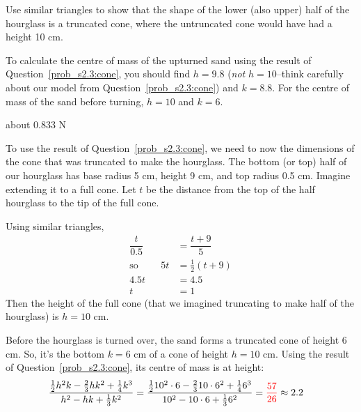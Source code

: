 \begin{hint}
Use similar triangles to show that the shape of the lower (also upper) half of the hourglass is a truncated cone, where the untruncated cone would have had a height 10 cm.

To calculate the centre of mass of the upturned sand using the result of Question~\ref{prob_s2.3:cone}, you should find $h=9.8$ (\emph{not} $h=10$--think carefully about our model from Question~\ref{prob_s2.3:cone}) and $k=8.8$. For the centre of mass of the sand before turning, $h=10$ and $k=6$.
\end{hint}
\begin{answer}
about 0.833 N
\end{answer}
\begin{solution}
To use the result of Question~\ref{prob_s2.3:cone}, we need to now the dimensions of the cone that was truncated to make the hourglass. The bottom (or top) half of our hourglass has base radius 5 cm,  height 9 cm, and top radius 0.5 cm. Imagine extending it to a full cone. Let $t$ be the distance from the top of the half hourglass to the tip of the full cone.
\begin{center}
\end{center}
Using similar triangles, \begin{align*}\dfrac{t}{0.5} &= \dfrac{t+9}{5}\\
\text{so }\qquad 5t&=\frac{1}{2}(t+9)\\
4.5t&=4.5\\
t&=1
\end{align*}
Then the height of the full cone (that we imagined truncating to make half of the hourglass) is $h=10$ cm.

Before the hourglass is turned over, the sand forms a truncated cone of height $6$ cm. So, it's the bottom $k=6$ cm of a cone of height $h=10$ cm. Using the result of Question~\ref{prob_s2.3:cone}, its centre of mass is at height:
\begin{align*}
\frac{\frac{1}{2}h^2k - \frac{2}{3}hk^2+\frac{1}{4}k^3}{h^2-hk+\frac{1}{3}k^2}&=
\frac{\frac{1}{2}10^2\cdot 6 - \frac{2}{3}10\cdot 6^2+\frac{1}{4}6^3}{10^2-10\cdot 6+\frac{1}{3}6^2}=\textcolor{red}{\frac{57}{26}}\approx2.2
\end{align*}


\end{solution}
